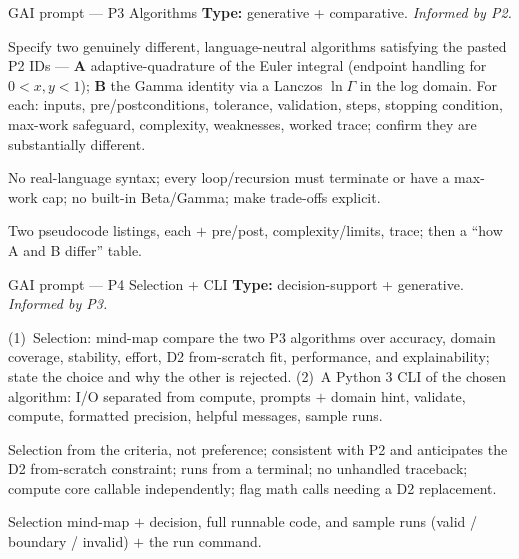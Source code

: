 \documentclass[aspectratio=169]{beamer}
\begin{document}
\begin{frame}{GAI prompt --- P3 Algorithms}
  \small \textbf{Type:} generative + comparative. \emph{Informed by P2.}
  \begin{description}\footnotesize
    \item[TASK] Specify two genuinely different, language-neutral algorithms satisfying the
      pasted P2 IDs --- \textbf{A} adaptive-quadrature of the Euler integral (endpoint
      handling for $0<x,y<1$); \textbf{B} the Gamma identity via a Lanczos $\ln\Gamma$ in
      the log domain. For each: inputs, pre/postconditions, tolerance, validation,
      steps, stopping condition, max-work safeguard, complexity, weaknesses, worked
      trace; confirm they are substantially different.
    \item[RESTRICTIONS] No real-language syntax; every loop/recursion must terminate or
      have a max-work cap; no built-in Beta/Gamma; make trade-offs explicit.
    \item[OUTPUT] Two pseudocode listings, each $+$ pre/post, complexity/limits, trace;
      then a ``how A and B differ'' table.
  \end{description}
\end{frame}

\begin{frame}{GAI prompt --- P4 Selection + CLI}
  \small \textbf{Type:} decision-support + generative. \emph{Informed by P3.}
  \begin{description}\footnotesize
    \item[TASK] (1)~Selection: mind-map compare the two P3 algorithms over accuracy,
      domain coverage, stability, effort, D2 from-scratch fit, performance, and
      explainability; state the choice and why the other is rejected. (2)~A Python 3 CLI
      of the chosen algorithm: I/O separated from compute, prompts $+$ domain hint,
      validate, compute, formatted precision, helpful messages, sample runs.
    \item[RESTRICTIONS] Selection from the criteria, not preference; consistent with P2
      and anticipates the D2 from-scratch constraint; runs from a terminal; no unhandled
      traceback; compute core callable independently; flag math calls needing a D2
      replacement.
    \item[OUTPUT] Selection mind-map $+$ decision, full runnable code, and sample runs
      (valid / boundary / invalid) $+$ the run command.
  \end{description}
\end{frame}
\end{document}

